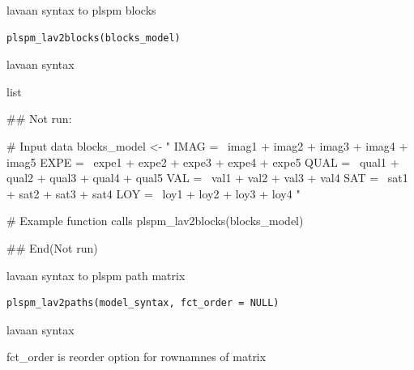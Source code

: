 \documentclass[a4paper]{book}
\begin{document}
%
\begin{Description}
lavaan syntax to plspm blocks
\end{Description}
%
\begin{Usage}
\begin{verbatim}
plspm_lav2blocks(blocks_model)
\end{verbatim}
\end{Usage}
%
\begin{Arguments}
\begin{ldescription}
\item[\code{blocks\_model}] lavaan syntax
\end{ldescription}
\end{Arguments}
%
\begin{Value}
list
\end{Value}
%
\begin{Examples}
\begin{ExampleCode}
## Not run: 

# Input data
blocks_model <- "
IMAG =~ imag1 + imag2 + imag3 + imag4 + imag5
EXPE =~ expe1 + expe2 + expe3 + expe4 + expe5
QUAL =~ qual1 + qual2 + qual3 + qual4 + qual5
VAL =~ val1 + val2 + val3 + val4
SAT =~ sat1 + sat2 + sat3 + sat4
LOY =~ loy1 + loy2 + loy3 + loy4
"

# Example function calls
plspm_lav2blocks(blocks_model)


## End(Not run)
\end{ExampleCode}
\end{Examples}
%
\begin{Description}
lavaan syntax to plspm path matrix
\end{Description}
%
\begin{Usage}
\begin{verbatim}
plspm_lav2paths(model_syntax, fct_order = NULL)
\end{verbatim}
\end{Usage}
%
\begin{Arguments}
\begin{ldescription}
\item[\code{model\_syntax}] lavaan syntax

\item[\code{fct\_order}] fct\_order is reorder option for rownamnes of matrix
\end{ldescription}
\end{Arguments}
\end{document}
